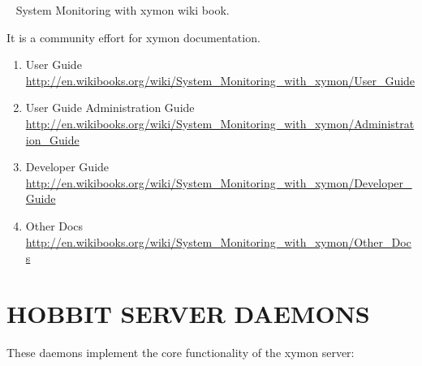~\cite{wikibook:wikibooktjyang} System Monitoring with xymon wiki book.

It is a community effort for xymon documentation.

\begin{enumerate}

\item User Guide  \url{http://en.wikibooks.org/wiki/System_Monitoring_with_xymon/User_Guide}

\item User Guide Administration Guide
  \url{http://en.wikibooks.org/wiki/System_Monitoring_with_xymon/Administration_Guide}

\item Developer Guide \url{http://en.wikibooks.org/wiki/System_Monitoring_with_xymon/Developer_Guide}

\item Other Docs
\url{http://en.wikibooks.org/wiki/System_Monitoring_with_xymon/Other_Docs}

\end{enumerate}

\section{HOBBIT SERVER DAEMONS}
 These daemons implement the core functionality of the xymon server: 

